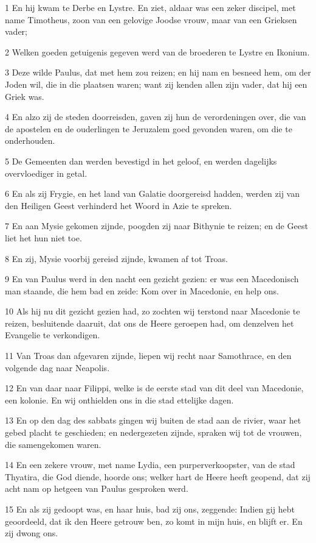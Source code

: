 \par 1 En hij kwam te Derbe en Lystre. En ziet, aldaar was een zeker discipel, met name Timotheus, zoon van een gelovige Joodse vrouw, maar van een Grieksen vader;
\par 2 Welken goeden getuigenis gegeven werd van de broederen te Lystre en Ikonium.
\par 3 Deze wilde Paulus, dat met hem zou reizen; en hij nam en besneed hem, om der Joden wil, die in die plaatsen waren; want zij kenden allen zijn vader, dat hij een Griek was.
\par 4 En alzo zij de steden doorreisden, gaven zij hun de verordeningen over, die van de apostelen en de ouderlingen te Jeruzalem goed gevonden waren, om die te onderhouden.
\par 5 De Gemeenten dan werden bevestigd in het geloof, en werden dagelijks overvloediger in getal.
\par 6 En als zij Frygie, en het land van Galatie doorgereisd hadden, werden zij van den Heiligen Geest verhinderd het Woord in Azie te spreken.
\par 7 En aan Mysie gekomen zijnde, poogden zij naar Bithynie te reizen; en de Geest liet het hun niet toe.
\par 8 En zij, Mysie voorbij gereisd zijnde, kwamen af tot Troas.
\par 9 En van Paulus werd in den nacht een gezicht gezien: er was een Macedonisch man staande, die hem bad en zeide: Kom over in Macedonie, en help ons.
\par 10 Als hij nu dit gezicht gezien had, zo zochten wij terstond naar Macedonie te reizen, besluitende daaruit, dat ons de Heere geroepen had, om denzelven het Evangelie te verkondigen.
\par 11 Van Troas dan afgevaren zijnde, liepen wij recht naar Samothrace, en den volgende dag naar Neapolis.
\par 12 En van daar naar Filippi, welke is de eerste stad van dit deel van Macedonie, een kolonie. En wij onthielden ons in die stad ettelijke dagen.
\par 13 En op den dag des sabbats gingen wij buiten de stad aan de rivier, waar het gebed placht te geschieden; en nedergezeten zijnde, spraken wij tot de vrouwen, die samengekomen waren.
\par 14 En een zekere vrouw, met name Lydia, een purperverkoopster, van de stad Thyatira, die God diende, hoorde ons; welker hart de Heere heeft geopend, dat zij acht nam op hetgeen van Paulus gesproken werd.
\par 15 En als zij gedoopt was, en haar huis, bad zij ons, zeggende: Indien gij hebt geoordeeld, dat ik den Heere getrouw ben, zo komt in mijn huis, en blijft er. En zij dwong ons.
